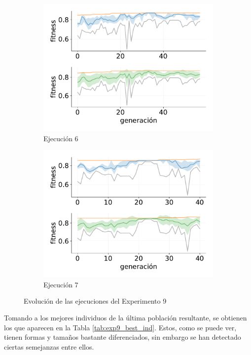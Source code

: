 \begin{figure}[p]
\begin{subfigure}{0.47\textwidth}
        \includegraphics[width=\textwidth]{figuras/experimentos/exp9/ind_6.pdf}
        \caption{Ejecución 6}
    \end{subfigure}
    \hfill
    \begin{subfigure}{0.47\textwidth}
        \centering
        \includegraphics[width=\textwidth]{figuras/experimentos/exp9/ind_7.pdf}
        \caption{Ejecución 7}
    \end{subfigure}
    \hfill
\caption{Evolución de las ejecuciones del Experimento 9}
\label{fig:exp9_evolucion}
\end{figure}

Tomando a los mejores individuos de la última población resultante, se obtienen los que aparecen en la Tabla \ref{tab:exp9_best_ind}. Estos, como se puede ver, tienen formas y tamaños bastante diferenciados, sin embargo se han detectado ciertas semejanzas entre ellos.

